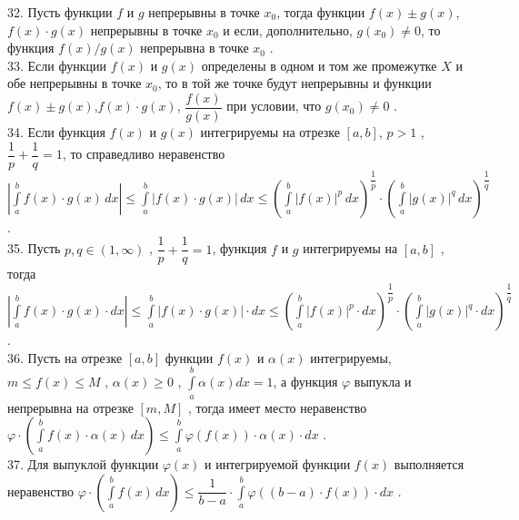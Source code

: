 \documentclass[12pt]{article}
\begin{document}
32. Пусть функции ${\displaystyle f}$ и ${\displaystyle g}$ непрерывны в точке ${\displaystyle x_0}$, тогда функции ${\displaystyle f(x) \pm g(x)}$, ${\displaystyle f(x) \cdot g(x)}$ непрерывны в точке ${\displaystyle x_0}$ и если, дополнительно, ${\displaystyle g(x_0)\neq 0}$, то функция ${\displaystyle f(x)/g(x)}$ непрерывна в точке ${\displaystyle x_0}$ .\\

33. Если функции ${\displaystyle f(x)}$ и ${\displaystyle g(x)}$ определены в одном и том же промежутке ${\displaystyle X}$ и обе непрерывны в точке ${\displaystyle x_0}$, то в той же точке будут непрерывны и функции ${\displaystyle f(x) \pm g(x)}$,${\displaystyle f(x) \cdot g(x)}$, ${\displaystyle \dfrac{f(x)}{g(x)}}$ при условии, что ${\displaystyle g(x_0) \neq 0}$ .\\

34. Если функция ${\displaystyle f(x)}$ и ${\displaystyle g(x)}$ интегрируемы на отрезке ${\displaystyle [a,b]}$, ${\displaystyle p>1}$ , ${\displaystyle \dfrac{1}{p}+\dfrac{1}{q}=1}$, то справедливо неравенство ${\displaystyle |\int \limits _{a}^{b} f(x)\cdot g(x)\, dx| \leq \int \limits _{a}^{b} |f(x)\cdot g(x)| \, dx \leq (\int \limits _{a}^{b} |f(x)|^{p} \, dx)^{\dfrac{1}{p}}\cdot (\int \limits _{a}^{b} |g(x)|^{q} \, dx)^{\dfrac{1}{q}}}$ .\\

35. Пусть ${\displaystyle p,q \in (1,\infty)}$ , ${\displaystyle \dfrac{1}{p}+\dfrac{1}{q}=1}$, функция ${\displaystyle f}$ и ${\displaystyle g}$ интегрируемы на ${\displaystyle [a,b]}$ , тогда ${\displaystyle |\int \limits _{a}^{b} f(x)\cdot g(x)\cdot dx| \leq \int \limits _{a}^{b} |f(x)\cdot g(x)| \cdot dx \leq (\int \limits _{a}^{b} |f(x)|^{p} \cdot dx)^{\dfrac{1}{p}}\cdot (\int \limits _{a}^{b} |g(x)|^{q} \cdot dx)^{\dfrac{1}{q}}}$ .\\

36. Пусть на отрезке ${\displaystyle [a,b]}$ функции ${\displaystyle f(x)}$ и ${\displaystyle \alpha(x)}$ интегрируемы, ${\displaystyle m \leq f(x) \leq M}$ , ${\alpha(x) \geq 0}$ , ${\displaystyle \int \limits _{a}^{b} \alpha(x) dx=1}$, а функция ${\displaystyle \varphi}$ выпукла и непрерывна на отрезке ${\displaystyle [m,M]}$ , тогда имеет место неравенство ${\displaystyle \varphi \cdot (\int \limits _{a}^{b} f(x)\cdot \alpha(x)\,dx) \leq \int \limits _{a}^{b} \varphi(f(x))\cdot \alpha(x)\cdot dx}$ .\\

37. Для выпуклой функции ${\displaystyle \varphi(x)}$ и интегрируемой функции ${\displaystyle f(x)}$ выполняется неравенство ${\displaystyle \varphi\cdot (\int \limits _{a}^{b} f(x)\,dx) \leq \dfrac{1}{b-a}\cdot \int \limits _{a}^{b} \varphi((b-a)\cdot f(x))\cdot dx}$ .\\
\end{document}
